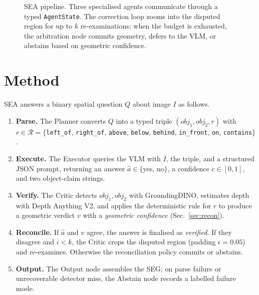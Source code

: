 \documentclass[10pt,twocolumn,letterpaper]{article}
\newcommand{\obj}[1]{\textit{#1}}
\newcommand{\rel}[1]{\texttt{#1}}
\begin{document}
\begin{figure}[!t]
\caption{SEA pipeline. Three specialised agents communicate through a typed
\texttt{AgentState}. The correction loop zooms into the disputed region for up
to $k$ re-examinations; when the budget is exhausted, the arbitration node
commits geometry, defers to the VLM, or abstains based on geometric confidence.}
\label{fig:arch}
\end{figure}

\section{Method}
SEA answers a binary spatial question $Q$ about image $I$ as follows.
\begin{enumerate}
\item \textbf{Parse.} The Planner converts $Q$ into a typed triple
$(\obj{obj}_1, \obj{obj}_2, r)$ with $r \in \mathcal{R} = \{$\rel{left\_of},
\rel{right\_of}, \rel{above}, \rel{below}, \rel{behind}, \rel{in\_front},
\rel{on}, \rel{contains}$\}$.
\item \textbf{Execute.} The Executor queries the VLM with $I$, the triple, and
a structured JSON prompt, returning an answer $\hat{a}\in\{$yes, no$\}$, a
confidence $c\in[0,1]$, and two object-claim strings.
\item \textbf{Verify.} The Critic detects $\obj{obj}_1, \obj{obj}_2$ with
GroundingDINO, estimates depth with Depth Anything V2, and applies the
deterministic rule for $r$ to produce a geometric verdict $v$ with a
\emph{geometric confidence} (Sec.~\ref{sec:recon}).
\item \textbf{Reconcile.} If $\hat{a}$ and $v$ agree, the answer is finalised
as \emph{verified}. If they disagree and $i<k$, the Critic crops the disputed
region (padding $\epsilon=0.05$) and re-examines. Otherwise the reconciliation
policy commits or abstains.
\item \textbf{Output.} The Output node assembles the SEG; on parse failure or
unrecoverable detector miss, the Abstain node records a labelled failure mode.
\end{enumerate}
\end{document}
